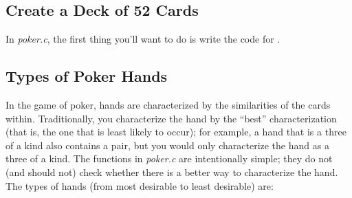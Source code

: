 \subsection{Create a Deck of 52 Cards}

In \textit{poker.c}, the first thing you'll want to do is write the code for .
\begin{description}
\end{description}

\subsection{Types of Poker Hands} \label{subsec:typesofpokerhands}

In the game of poker, hands are characterized by the similarities of the cards within.
Traditionally, you characterize the hand by the ``best'' characterization (that is, the one that is least likely to occur);
for example, a hand that is a three of a kind also contains a pair, but you would only characterize the hand as a three of a kind.
The  functions in \textit{poker.c} are intentionally simple;
they do not (and should not) check whether there is a better way to characterize the hand.
The types of hands (from most desirable to least desirable) are:

